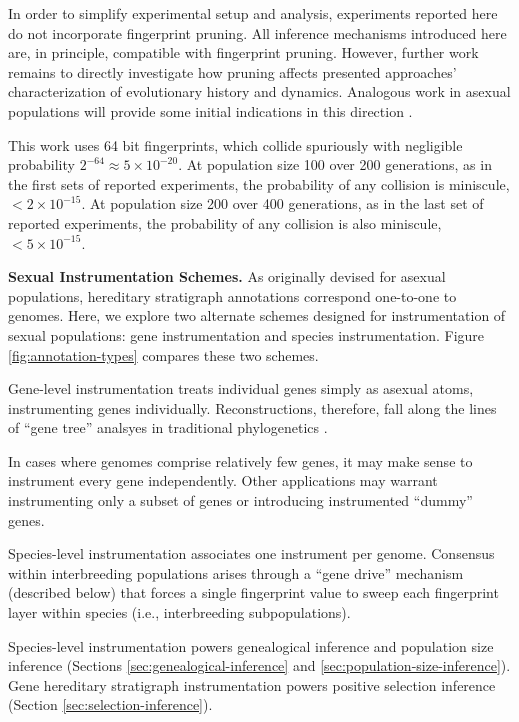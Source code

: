 In order to simplify experimental setup and analysis, experiments reported here do not incorporate fingerprint pruning.
All inference mechanisms introduced here are, in principle, compatible with fingerprint pruning.
However, further work remains to directly investigate how pruning affects presented approaches' characterization of evolutionary history and dynamics.
Analogous work in asexual populations will provide some initial indications in this direction \citep{moreno2023toward}.

This work uses 64 bit fingerprints, which collide spuriously with negligible probability $2^{-64} \approx 5 \times 10^{-20}$.
At population size 100 over 200 generations, as in the first sets of reported experiments, the probability of any collision is miniscule, $< 2 \times 10^{-15}$.
At population size 200 over 400 generations, as in the last set of reported experiments, the probability of any collision is also miniscule, $< 5 \times 10^{-15}$.


\textbf{Sexual Instrumentation Schemes.}
As originally devised for asexual populations, hereditary stratigraph annotations correspond one-to-one to genomes.
Here, we explore two alternate schemes designed for instrumentation of sexual populations: gene instrumentation and species instrumentation.
Figure \ref{fig:annotation-types} compares these two schemes.

Gene-level instrumentation treats individual genes simply as asexual atoms, instrumenting genes individually.
Reconstructions, therefore, fall along the lines of ``gene tree'' analsyes in traditional phylogenetics \citep{avise1989gene}.

In cases where genomes comprise relatively few genes, it may make sense to instrument every gene independently.
Other applications may warrant instrumenting only a subset of genes or introducing instrumented ``dummy'' genes.

Species-level instrumentation associates one instrument per genome.
Consensus within interbreeding populations arises through a ``gene drive'' mechanism (described below) that forces a single fingerprint value to sweep each fingerprint layer within species (i.e., interbreeding subpopulations).

Species-level instrumentation powers genealogical inference and population size inference (Sections \ref{sec:genealogical-inference} and \ref{sec:population-size-inference}).
Gene hereditary stratigraph instrumentation powers positive selection inference (Section \ref{sec:selection-inference}).

